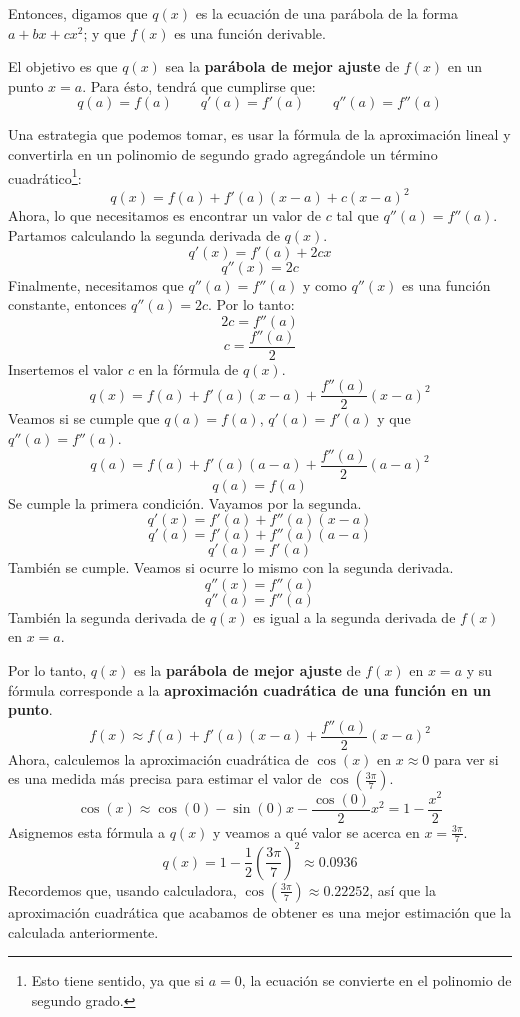 \documentclass[12pt]{article}
\begin{document}
Entonces, digamos que $q(x)$ es la ecuación de una parábola de la forma $a + bx + cx^{2}$; y que $f(x)$ es una función derivable.

El objetivo es que $q(x)$ sea la \textbf{parábola de mejor ajuste} de $f(x)$ en un punto $x = a$. Para ésto, tendrá que cumplirse que:
\[q(a) = f(a) \qquad q'(a) = f'(a) \qquad q''(a) = f''(a)\]
 
Una estrategia que podemos tomar, es usar la fórmula de la aproximación lineal y convertirla en un polinomio de segundo grado agregándole un término cuadrático\footnote{Esto tiene sentido, ya que si $a = 0$, la ecuación se convierte en el polinomio de segundo grado.}:
\[q(x) = f(a) + f'(a)(x - a) + c(x - a)^{2}\]
Ahora, lo que necesitamos es encontrar un valor de $c$ tal que $q''(a) = f''(a)$. Partamos calculando la segunda derivada de $q(x)$.
\[q'(x) = f'(a) + 2cx\]
\[q''(x) = 2c\]
Finalmente, necesitamos que $q''(a) = f''(a)$ y como $q''(x)$ es una función constante, entonces $q''(a) = 2c$. Por lo tanto:
\[2c = f''(a)\]
\[c = \frac{f''(a)}{2}\]
Insertemos el valor $c$ en la fórmula de $q(x)$.
\[q(x) = f(a) + f'(a)(x - a) + \frac{f''(a)}{2}(x - a)^{2}\]
Veamos si se cumple que $q(a) = f(a)$, $q'(a) = f'(a)$ y que $q''(a) = f''(a)$.
\[q(a) = f(a) + f'(a)(a - a) + \frac{f''(a)}{2}(a - a)^{2}\]
\[q(a) = f(a)\]
Se cumple la primera condición. Vayamos por la segunda.
\[q'(x) = f'(a) + f''(a)(x - a)\]
\[q'(a) = f'(a) + f''(a)(a - a)\]
\[q'(a) = f'(a)\]
También se cumple. Veamos si ocurre lo mismo con la segunda derivada.
\[q''(x) = f''(a)\]
\[q''(a) = f''(a)\]
También la segunda derivada de $q(x)$ es igual a la segunda derivada de $f(x)$ en $x = a$.

Por lo tanto, $q(x)$ es la \textbf{parábola de mejor ajuste} de $f(x)$ en $x = a$ y su fórmula corresponde a la \textbf{aproximación cuadrática de una función en un punto}.
\[f(x) \approx f(a) + f'(a)(x - a) + \frac{f''(a)}{2}(x - a)^{2}\]
Ahora, calculemos la aproximación cuadrática de $\cos(x)$ en $x \approx 0$ para ver si es una medida más precisa para estimar el valor de $\cos\left(\frac{3\pi}{7}\right)$.
\[\cos(x) \approx \cos(0) - \sin(0)x - \frac{\cos(0)}{2}x^{2} = 1 - \frac{x^{2}}{2}\]
Asignemos esta fórmula a $q(x)$ y veamos a qué valor se acerca en $x = \frac{3\pi}{7}$.
\[q(x) = 1 - \frac{1}{2} \left(\frac{3\pi}{7}\right)^{2} \approx 0.0936\]
Recordemos que, usando calculadora, $\cos\left(\frac{3\pi}{7}\right) \approx 0.22252$, así que la aproximación cuadrática que acabamos de obtener es una mejor estimación que la calculada anteriormente. 
\end{document}
